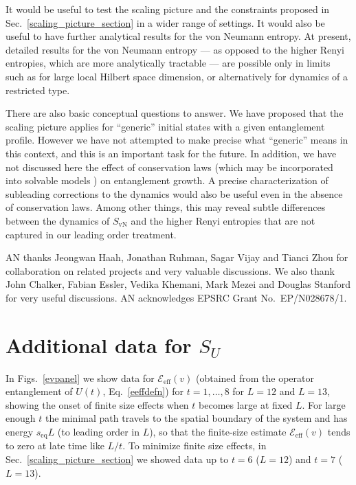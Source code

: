 \documentclass[aps,prx,twocolumn,superscriptaddress,floatfix,nofootinbib,prx]{revtex4}
\renewcommand{\>}{\right\rangle}
\newcommand{\<}{\left\langle}
\newcommand{\seq}{s_\text{eq}}
\newcommand{\lt}{\mathcal{E}}
\begin{document}
It would be  useful to test the scaling picture and the constraints proposed in Sec.~\ref{scaling_picture_section} in a wider range of settings.
It would also be useful to have further analytical results for the von Neumann entropy. At present, detailed results for the von Neumann entropy --- as opposed to the higher Renyi entropies, which are more analytically tractable --- are possible only in limits such as for large local Hilbert space dimension, or alternatively for dynamics of a restricted type.
 

There are also basic conceptual questions to answer.
We have proposed that the scaling picture applies for ``generic'' initial states with a given entanglement profile. However we have not attempted to make precise what ``generic'' means in this context, and this is an important task for the future.   
In addition, we have not discussed here the effect of conservation laws (which may be incorporated into solvable models \cite{conservationlaws1,conservationlaws2}) on entanglement growth.
A  precise characterization of subleading corrections to the dynamics would also be useful even in the absence of conservation laws. Among other things, this may reveal subtle differences between the dynamics of $S_\mathrm{vN}$ and the higher Renyi entropies that are not captured in our leading order treatment.


\begin{acknowledgments}
AN thanks Jeongwan Haah, Jonathan Ruhman, Sagar Vijay and Tianci Zhou for collaboration on related projects and very valuable discussions.
We also thank John Chalker, Fabian Essler, Vedika Khemani, Mark Mezei and Douglas Stanford for very useful discussions.
AN acknowledges EPSRC Grant No.~EP/N028678/1. 

\end{acknowledgments}


\appendix

\section{Additional data for $S_U$}
\label{app:SUdata}

In Figs.~\ref{evpanel} we show data for  $\lt_\text{eff}(v)$ (obtained from the operator entanglement of $U(t)$, Eq.~\ref{eeffdefn}) for $t=1,\ldots, 8$ for $L=12$ and $L=13$, showing the onset of finite size effects when $t$ becomes large at fixed $L$.  For large enough $t$ the minimal path travels to the spatial boundary of the system and has energy $\seq L$ (to leading order in $L$),  so that the finite-size estimate $\lt_\text{eff}(v)$ tends to zero at late time like $L/t$.
 To minimize finite size effects, in Sec.~\ref{scaling_picture_section} we showed data up to $t=6$ ($L=12$) and $t=7$ ($L=13$). 
 
\end{document}
